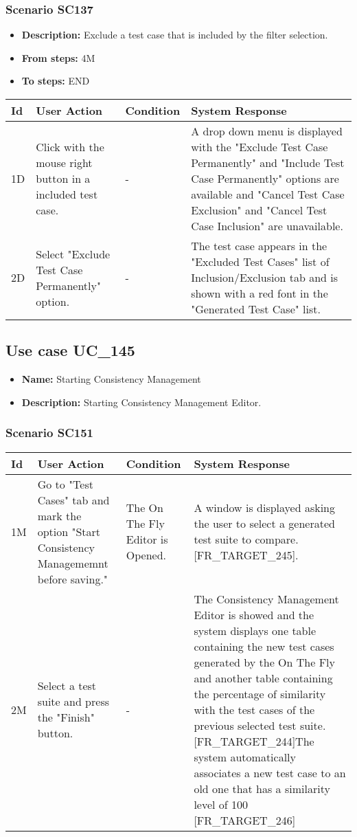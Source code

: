 \documentclass[a4paper,11pt]{article}
\newcommand{\bl}{\\ \hline}
\begin{document}
\subsubsection*{Scenario SC137}
\begin{itemize}
\item {\bf Description:} Exclude a test case that is included by the filter
					selection.
\item {\bf From steps:} 4M
\item {\bf To steps:} END
\end{itemize}
\begin{tabular}{|p{0.4in}|p{1.5in}|p{1.5in}|p{1.5in}|}
\hline
Id & User Action & Condition & System Response \bl 
1D & Click with the mouse right button in a included test case.
					 & - & A drop down menu is displayed with the "Exclude Test Case
						Permanently" and "Include Test Case Permanently" options are
						available and "Cancel Test Case Exclusion" and "Cancel Test Case
						Inclusion" are unavailable.\bl
2D & Select "Exclude Test Case Permanently" option. & - & The test case appears in the "Excluded Test Cases" list
						of Inclusion/Exclusion tab and is shown with a red font in the
						"Generated Test Case" list.\bl
\end{tabular}
\subsection*{Use case UC_145}
\begin{itemize}
\item {\bf Name: }Starting Consistency Management
\item {\bf Description: }Starting Consistency Management Editor.
\end{itemize}
\subsubsection*{Scenario SC151}
\begin{tabular}{|p{0.4in}|p{1.5in}|p{1.5in}|p{1.5in}|}
\hline
Id & User Action & Condition & System Response \bl 
1M & Go to "Test Cases" tab and mark the option "Start
						Consistency Managememnt before saving." & The On The Fly Editor is Opened. & A window is displayed asking the user to select a
						generated test suite to compare. [FR_TARGET_245].\bl
2M & Select a test suite and press the "Finish" button. & - & The Consistency Management Editor is showed and the
						system displays one table containing the new test cases generated
						by the On The Fly and another table containing the percentage of
						similarity with the test cases of the previous selected test
						suite. [FR_TARGET_244]The system automatically associates a new
						test case to an old one that has a similarity level of 100%
						[FR_TARGET_246]\bl
\end{tabular}
\end{document}
